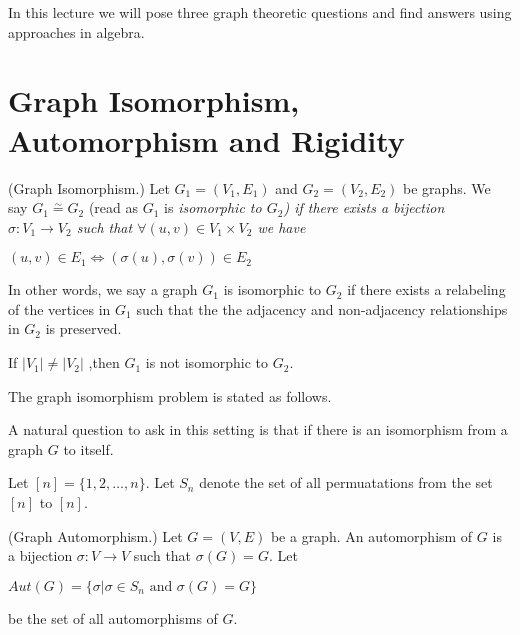 
In this lecture we will pose three graph theoretic questions and find answers using approaches in algebra.


\section{Graph Isomorphism, Automorphism and Rigidity}


\begin{definition}(Graph Isomorphism.)
Let $G_1=(V_1,E_1)$ and $G_2=(V_2,E_2)$ be graphs. We say $G_1\stackrel{\sim}{=}G_2$ (read as $G_1$ is \em isomorphic to $G_2$) if there exists a bijection $\sigma : V_1\rightarrow V_2$ such that $\forall (u,v) \in V_1\times V_2$ we have
\begin{center}
$(u,v)\in E_1 \iff (\sigma(u),\sigma(v))\in E_2$
\end{center}
\end{definition}

In other words, we say a graph $G_1$ is isomorphic to $G_2$ if there exists a relabeling of the vertices in $G_1$  such that the the adjacency and non-adjacency relationships in $G_2$ is preserved. 
\begin{observation}
If $|V_1|\neq |V_2|$ ,then $G_1$ is not isomorphic to $G_2$.
\end{observation}

The graph isomorphism problem is stated as follows. 
\begin{center}
\end{center}

A natural question to ask in this setting is that if there is an isomorphism from a graph $G$ to itself. 

Let $[n]=\{1,2,\ldots,n\}$. Let $S_n$ denote the set of all permuatations from the set $[n]$ to $[n]$.

\begin{definition}(Graph Automorphism.) 
Let $G=(V,E)$ be a graph. An automorphism of $G$ is a bijection $\sigma:V\rightarrow V$ such that $\sigma(G)= G$. Let
\begin{center}
$Aut(G)= \{\sigma | \sigma\in S_n \text{~and~} \sigma(G)= G \}$
\end{center}
be the set of all automorphisms of $G$. 
\end{definition}




